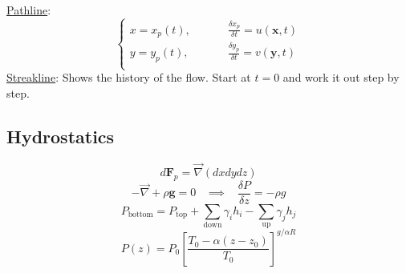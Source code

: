 \documentclass[twocolumn, 12pt]{article}
\begin{document}
{\noindent
\underline{Pathline}:
\[
\begin{cases}
    x = x_p(t),   \hspace{30pt}& \frac{\delta x_p}{\delta t} = u(\textbf{x},t)\\
    y = y_p(t),                &  \frac{\delta y_p}{\delta t} = v(\textbf{y},t)\\
\end{cases}
\]
\noindent
\underline{Streakline}:\newline
Shows the history of the flow. Start at \(t=0\) and work it out step by step.

\subsection*{Hydrostatics}
\begin{equation*}
    d\textbf{F}_p = \vec{\nabla}(dxdydz)
\end{equation*}
\begin{equation*}
    -\vec{\nabla} +\rho \textbf{g} =0 \hspace{10pt} \implies  \hspace{10pt} \frac{\delta P}{\delta z} = -\rho g
\end{equation*}
\begin{equation*}
    P_{\text{bottom}} = P_{\text{top}} + \sum_{\text{down}} \gamma_i h_i - \sum_{\text{up}} \gamma_j h_j 
\end{equation*}
\begin{equation*}
    P(z) = P_0 \left[ \frac{T_0 - \alpha (z-z_0)}{T_0}  \right]^{g/ \alpha R}
\end{equation*}



}
\end{document}

